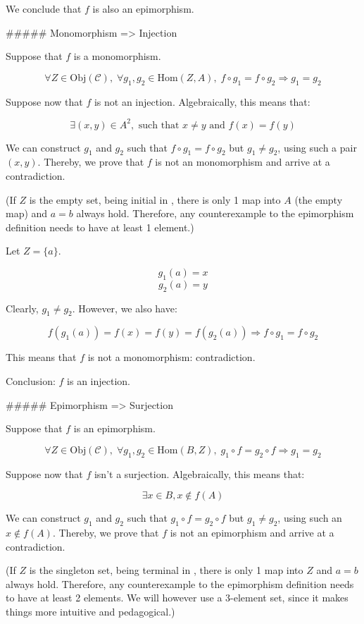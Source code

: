 We conclude that $f$ is also an epimorphism.


##### Monomorphism => Injection

Suppose that $f$ is a monomorphism.

$$
\forall Z \in \text{Obj}(\mathcal{C}), \;
\forall g_1, g_2 \in \text{Hom}(Z, A), \;
f \circ g_1 = f \circ g_2 \Rightarrow g_1 = g_2
$$

Suppose now that $f$ is not an injection. Algebraically, this means that:

$$\exists (x, y) \in A^2, \text{ such that } x \neq y \text{ and } f(x) = f(y)$$

We can construct $g_1$ and $g_2$ such that $f \circ g_1 = f \circ g_2$ but $g_1 \neq g_2$, using such a pair $(x, y)$. Thereby, we prove that $f$ is not an monomorphism and arrive at a contradiction.

(If $Z$ is the empty set, being initial in , there is only 1 map into $A$ (the empty map) and $a = b$ always hold. Therefore, any counterexample to the epimorphism definition needs to have at least 1 element.)

Let $Z = \{a\}$.

$$g_1(a) = x$$
$$g_2(a) = y$$

Clearly, $g_1 \neq g_2$. However, we also have:

$$
f(g_1(a)) = f(x) = f(y) = f(g_2(a)) \Rightarrow
f \circ g_1 = f \circ g_2
$$

This means that $f$ is not a monomorphism: contradiction.

Conclusion: $f$ is an injection.


##### Epimorphism => Surjection

Suppose that $f$ is an epimorphism.

$$
\forall Z \in \text{Obj}(\mathcal{C}), \;
\forall g_1, g_2 \in \text{Hom}(B, Z), \;
g_1 \circ f = g_2 \circ f \Rightarrow g_1 = g_2
$$

Suppose now that $f$ isn't a surjection. Algebraically, this means that:

$$\exists x \in B, x \notin f(A)$$

We can construct $g_1$ and $g_2$ such that $g_1 \circ f = g_2 \circ f$ but $g_1 \neq g_2$, using such an $x \notin f(A)$. Thereby, we prove that $f$ is not an epimorphism and arrive at a contradiction.

(If $Z$ is the singleton set, being terminal in , there is only 1 map into $Z$ and $a = b$ always hold. Therefore, any counterexample to the epimorphism definition needs to have at least 2 elements. We will however use a 3-element set, since it makes things more intuitive and pedagogical.)

